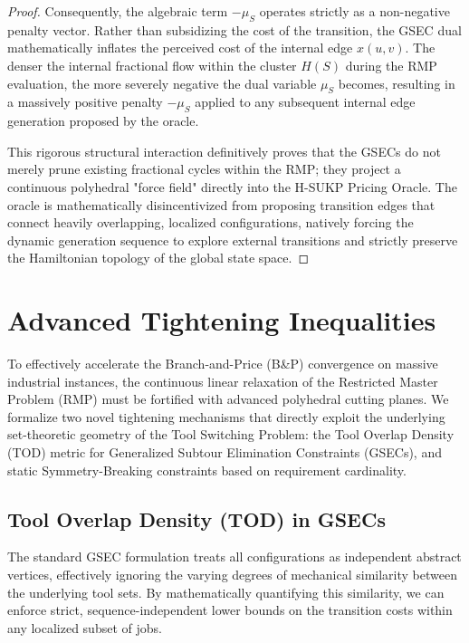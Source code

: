 \documentclass[11pt, a4paper]{book}
\begin{document}
\begin{proof}
		Consequently, the algebraic term $-\mu_S$ operates strictly as a non-negative penalty vector. Rather than subsidizing the cost of the transition, the GSEC dual mathematically inflates the perceived cost of the internal edge $x(u, v)$. The denser the internal fractional flow within the cluster $H(S)$ during the RMP evaluation, the more severely negative the dual variable $\mu_S$ becomes, resulting in a massively positive penalty $-\mu_S$ applied to any subsequent internal edge generation proposed by the oracle.
		
		This rigorous structural interaction definitively proves that the GSECs do not merely prune existing fractional cycles within the RMP; they project a continuous polyhedral "force field" directly into the H-SUKP Pricing Oracle. The oracle is mathematically disincentivized from proposing transition edges that connect heavily overlapping, localized configurations, natively forcing the dynamic generation sequence to explore external transitions and strictly preserve the Hamiltonian topology of the global state space.
	\end{proof}
	
	\section{Advanced Tightening Inequalities}
	
	To effectively accelerate the Branch-and-Price (B\&P) convergence on massive industrial instances, the continuous linear relaxation of the Restricted Master Problem (RMP) must be fortified with advanced polyhedral cutting planes. We formalize two novel tightening mechanisms that directly exploit the underlying set-theoretic geometry of the Tool Switching Problem: the Tool Overlap Density (TOD) metric for Generalized Subtour Elimination Constraints (GSECs), and static Symmetry-Breaking constraints based on requirement cardinality.
	
	\subsection{Tool Overlap Density (TOD) in GSECs}
	
	The standard GSEC formulation treats all configurations as independent abstract vertices, effectively ignoring the varying degrees of mechanical similarity between the underlying tool sets. By mathematically quantifying this similarity, we can enforce strict, sequence-independent lower bounds on the transition costs within any localized subset of jobs.
	
\end{document}
